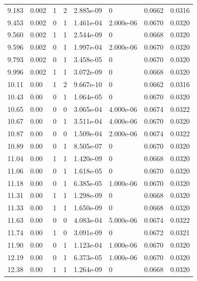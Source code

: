 \documentclass[preview]{standalone}
\begin{document}
{{{\begin{tabular}{L{1.2cm}C{1.2cm} C{0.3cm}C{0.5cm} C{1.4cm}C{1.4cm} C{1.4cm}C{1.4cm}}
  9.183  &  0.002  & 1     &  2 &  2.885e-09  & 0  & 0.0662 &  0.0316   \\ 
  9.453  &  0.002  & 0     &  1 &  1.461e-04  & 2.000e-06  & 0.0670 &  0.0320   \\ 
  9.560  &  0.002  & 1     &  1 &  2.544e-09  & 0  & 0.0668 &  0.0320   \\ 
  9.596  &  0.002  & 0     &  1 &  1.997e-04  & 2.000e-06  & 0.0670 &  0.0320   \\ 
  9.793  &  0.002  & 0     &  1 &  3.458e-05  & 0  & 0.0670 &  0.0320   \\ 
  9.996  &  0.002  & 1     &  1 &  3.072e-09  & 0  & 0.0668 &  0.0320   \\ 
  10.11  &  0.00  & 1     &  2 &  9.667e-10  & 0  & 0.0662 &  0.0316   \\ 
  10.43  &  0.00  & 0     &  1 &  1.064e-05  & 0  & 0.0670 &  0.0320   \\ 
  10.65  &  0.00  & 0     &  0 &  3.065e-04  & 4.000e-06  & 0.0674 &  0.0322   \\ 
  10.67  &  0.00  & 0     &  1 &  3.511e-04  & 4.000e-06  & 0.0670 &  0.0320   \\ 
  10.87  &  0.00  & 0     &  0 &  1.509e-04  & 2.000e-06  & 0.0674 &  0.0322   \\ 
  10.89  &  0.00  & 0     &  1 &  8.505e-07  & 0  & 0.0670 &  0.0320   \\ 
  11.04  &  0.00  & 1     &  1 &  1.420e-09  & 0  & 0.0668 &  0.0320   \\ 
  11.06  &  0.00  & 0     &  1 &  1.618e-05  & 0  & 0.0670 &  0.0320   \\ 
  11.18  &  0.00  & 0     &  1 &  6.385e-05  & 1.000e-06  & 0.0670 &  0.0320   \\ 
  11.31  &  0.00  & 1     &  1 &  1.298e-09  & 0  & 0.0668 &  0.0320   \\ 
  11.33  &  0.00  & 1     &  1 &  1.650e-09  & 0  & 0.0668 &  0.0320   \\ 
  11.63  &  0.00  & 0     &  0 &  4.083e-04  & 5.000e-06  & 0.0674 &  0.0322   \\ 
  11.74  &  0.00  & 1     &  0 &  3.091e-09  & 0  & 0.0672 &  0.0321   \\ 
  11.90  &  0.00  & 0     &  1 &  1.123e-04  & 1.000e-06  & 0.0670 &  0.0320   \\ 
  12.19  &  0.00  & 0     &  1 &  6.373e-05  & 1.000e-06  & 0.0670 &  0.0320   \\ 
  12.38  &  0.00  & 1     &  1 &  1.264e-09  & 0  & 0.0668 &  0.0320   \\ 

\end{tabular}}}}
\end{document}
